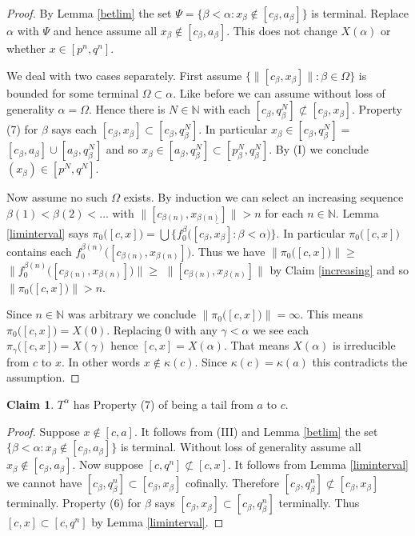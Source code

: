 \documentclass[12pt]{article}
\theoremstyle{plain}
\theoremstyle{definition}
\newcounter{ClaimCounter}
\newtheorem{claim}[ClaimCounter]{Claim}
\newcounter{claim5counter}
\newcommand{\A}{\ensuremath{\alpha}}
\newcommand{\K}{\ensuremath{\kappa}}
\newcommand{\B}{\ensuremath{\beta}}
\newcommand{\WW}{\ensuremath{\Omega}}
\newcommand{\G}{\ensuremath{\gamma}}
\newcommand{\NN}{\ensuremath{\mathbb N}}
\newcommand{\0}{\ensuremath{\varnothing}}
\begin{document}
	\begin{proof}
		By Lemma \ref{betlim} the set $\Psi = \big \{ \B < \A :x_\B \notin [c_\B,a_\B] \big \}$ is terminal.
		Replace $\A$ with $\Psi$ and hence assume all $x_\B \notin [c_\B,a_\B]$. This does not change $X(\A)$ or whether $x \in [p^n,q^n]$.
		
		
		We deal with two cases separately. First assume \mbox{$ \big \{ \big \| [c_\B,x_\B] \big \| : \B \in \WW\}$} is bounded for some terminal $\WW \subset \A$. Like before we can assume without loss of generality $\A=\WW$. 
		Hence there is $N \in \NN$ with each $[c_\B,q^N_\B] \not \subset [c_\B, x_\B]$.
		Property (7) for $\B$ says each $[c_\B, x_\B] \subset [c_\B,q^N_\B]$.
		In particular $ x_\B \in [c_\B,q^N_\B] =$ $ [c_\B,a_\B] \cup [a_\B,q^N_\B]$ and so $ x_\B \in [a_\B,q^N_\B] \subset [p^N_\B,q^N_\B]$.
		By (I) we conclude $(x_\B) \in [p^N,q^N]$.
		
		Now assume no such $\WW$ exists. By induction we can select an increasing sequence $\B(1) < \B(2) < \ldots$ with $\big \| [c_{\B(n)},x_{\B(n)}] \big \| > n$ for each $n \in \NN$.
		Lemma \ref{liminterval} says $\pi_0\big ( [c,x] \big ) = \overline {\bigcup \big \{f^\B_0\big ( [c_\B,x_\B]:\B <\A) \big \}}$.
		In particular $\pi_0\big ( [c,x] \big )$ contains each $f^{\B(n)}_0\big ( [c_{\B(n)},x_{\B(n)}] \big )$.
		Thus we have $\big \| \pi_0\big ( [c,x] \big ) \big \| \ge $ 
		$\big \|f^{\B(n)}_0\big ( [c_{\B(n)},x_{\B(n)}] \big )\big \|\ge $ 
		$\big \| [c_{\B(n)},x_{\B(n)}]\big \|$ by Claim \ref{increasing}
		and so $\big \| \pi_0\big ( [c,x] \big ) \big \| > n$.
		
		Since $n \in \NN$ was arbitrary we conclude $\big \| \pi_0\big ( [c,x] \big ) \big \| = \infty$.
		This means $\pi_0\big ( [c,x] \big ) = X(0)$.
		Replacing $0$ with any $\G < \A$ we see each $\pi_\G\big ( [c,x] \big ) = X(\G)$ hence $[c,x] = X(\A)$.
		That means $X(\A)$ is irreducible from $c$ to $x$. In other words $x \notin \K(c)$.
		Since $\K(c)=\K(a)$ this contradicts the assumption.
	\end{proof}
	
	
	\begin{claim}\label{longlim6}
		$T^\A$ has Property (7) of being a tail from $a$ to $c$.
	\end{claim}
	
	\begin{proof}
		Suppose $x \notin [c,a]$. 
		It follows from (III) and Lemma \ref{betlim} the set $\big \{ \B < \A: x_\B \notin [c_\B,a_\B] \big \}$ is terminal.
		Without loss of generality assume all $x_\B \notin [c_\B,a_\B]$.
		Now suppose %
		$[c,q^n] \not \subset [c,x]$.
		It follows from Lemma \ref{liminterval} we cannot have $[c_\B,q^n_\B] \subset [c_\B,x_\B]$ cofinally.
		Therefore $[c_\B,q^n_\B] \not \subset [c_\B,x_\B]$ terminally.
		Property (6) for $\B$ says $[c_\B,x_\B] \subset [c_\B,q^n_\B]$ terminally.
		Thus $[c,x] \subset [c,q^n]$ by Lemma \ref{liminterval}.
	\end{proof}
	
\end{document}
